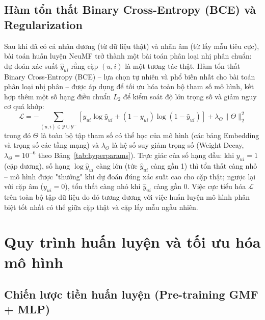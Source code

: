 \subsection{Hàm tổn thất Binary Cross-Entropy (BCE) và Regularization}
\label{subsec:bce_regularization}

Sau khi đã có cả nhãn dương (từ dữ liệu thật) và nhãn âm (từ lấy mẫu tiêu cực), bài toán huấn luyện NeuMF trở thành một bài toán phân loại nhị phân chuẩn: dự đoán xác suất $\hat{y}_{ui}$ rằng cặp $(u,i)$ là một tương tác thật. Hàm tổn thất Binary Cross-Entropy (BCE) -- lựa chọn tự nhiên và phổ biến nhất cho bài toán phân loại nhị phân -- được áp dụng để tối ưu hóa toàn bộ tham số mô hình, kết hợp thêm một số hạng điều chuẩn $L_2$ để kiểm soát độ lớn trọng số và giảm nguy cơ quá khớp:
\begin{equation}
    \mathcal{L} = -\sum_{(u, i) \in \mathcal{Y} \cup \mathcal{Y}^-} \left[ y_{ui} \log \hat{y}_{ui} + (1 - y_{ui}) \log (1 - \hat{y}_{ui}) \right] + \lambda_\Theta \|\Theta\|_2^2
    \label{eq:bce_loss_full}
\end{equation}
trong đó $\Theta$ là toàn bộ tập tham số có thể học của mô hình (các bảng Embedding và trọng số các tầng mạng) và $\lambda_\Theta$ là hệ số suy giảm trọng số (Weight Decay, $\lambda_\Theta = 10^{-6}$ theo Bảng~\ref{tab:hyperparams}). Trực giác của số hạng đầu: khi $y_{ui}=1$ (cặp dương), số hạng $\log \hat{y}_{ui}$ càng lớn (tức $\hat{y}_{ui}$ càng gần 1) thì tổn thất càng nhỏ -- mô hình được "thưởng" khi dự đoán đúng xác suất cao cho cặp thật; ngược lại với cặp âm ($y_{ui}=0$), tổn thất càng nhỏ khi $\hat{y}_{ui}$ càng gần 0. Việc cực tiểu hóa $\mathcal{L}$ trên toàn bộ tập dữ liệu do đó tương đương với việc huấn luyện mô hình phân biệt tốt nhất có thể giữa cặp thật và cặp lấy mẫu ngẫu nhiên.

\section{Quy trình huấn luyện và tối ưu hóa mô hình}
\label{sec:training_pipeline}

\subsection{Chiến lược tiền huấn luyện (Pre-training GMF + MLP)}
\label{subsec:pretraining_strategy}

